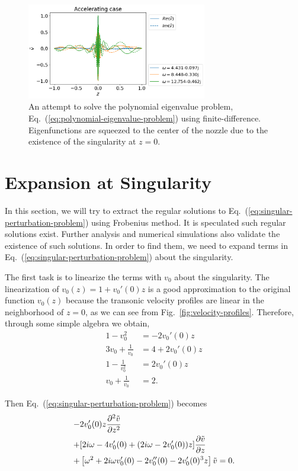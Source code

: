 \begin{figure} [htbp]
	\centering
	\includegraphics[width=0.7\textwidth]{figures/results-bad-accelerating-v}
	\caption{An attempt to solve the polynomial eigenvalue problem, Eq.~(\ref{eq:polynomial-eigenvalue-problem}) using finite-difference. Eigenfunctions are squeezed to the center of the nozzle due to the existence of the singularity at $z=0$.}
	\label{fig:failure-of-spectral-method}
\end{figure}

\section{Expansion at Singularity}
In this section, we will try to extract the regular solutions to Eq.~(\ref{eq:singular-perturbation-problem}) using Frobenius method. It is speculated such regular solutions exist. Further analysis and numerical simulations also validate the existence of such solutions. In order to find them, we need to expand terms in Eq.~(\ref{eq:singular-perturbation-problem}) about the singularity.

The first task is to linearize the terms with $v_0$ about the singularity. The linearization of $v_0(z) = 1 + v_0'(0)z$ is a good approximation to the original function $v_0(z)$ because the transonic velocity profiles are linear in the neighborhood of $z=0$, as we can see from Fig.~\ref{fig:velocity-profiles}. Therefore, through some simple algebra we obtain,
\begin{equation}
	\begin{aligned}
		1-v_0^2              & = -2v_0'(0)z    \\
		3v_0 + \frac{1}{v_0} & = 4 + 2v_0'(0)z \\
		1-\frac{1}{v_0^2}    & = 2v_0'(0)z     \\
		v_0 + \frac{1}{v_0}  & = 2.
	\end{aligned}
\end{equation}

Then Eq.~(\ref{eq:singular-perturbation-problem}) becomes
\begin{equation} \label{eq:perturbed-equation-full}
	\begin{aligned}
		- & 2v_0'(0)z\pdv[2]{\tilde{v}}{z}                                              \\
		+ & [2i\omega - 4v_0'(0) + (2i\omega - 2v_0'(0))z]\pdv{\tilde{v}}{z}            \\
		+ & \left[\omega^2 + 2i\omega v_0'(0) - 2v_0''(0) - 2v_0'(0)^3z\right]\tilde{v}
		= 0.
	\end{aligned}
\end{equation}


